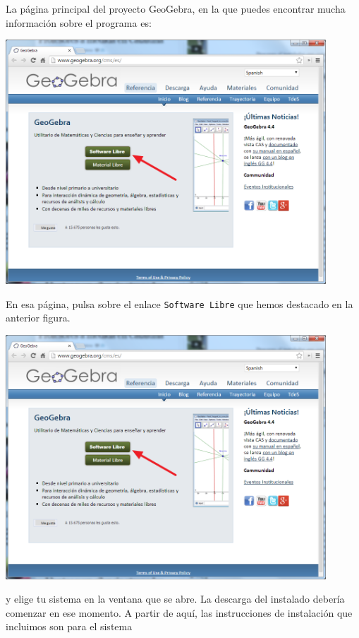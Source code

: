 \documentclass[10pt,a4paper]{article}\usepackage[]{graphicx}\usepackage[]{color}
\newcounter {cont01}
\begin{document}
La página principal del proyecto GeoGebra, en la que puedes encontrar mucha información sobre el
programa es:
\begin{center}
\end{center}
    \begin{center}
    \includegraphics[width=12cm]{../fig/Tut00-GeoGebraDescarga01.png}
    \end{center}
En esa página, pulsa sobre el enlace {\tt Software Libre} que hemos destacado en la anterior
figura.
    \begin{center}
    \includegraphics[width=12cm]{../fig/Tut00-GeoGebraDescarga01.png}
    \end{center}
y elige tu sistema en la ventana que se abre. La descarga del instalado debería comenzar en ese
momento. A partir de aquí, las instrucciones de instalación que incluimos son para el sistema
\end{document}
